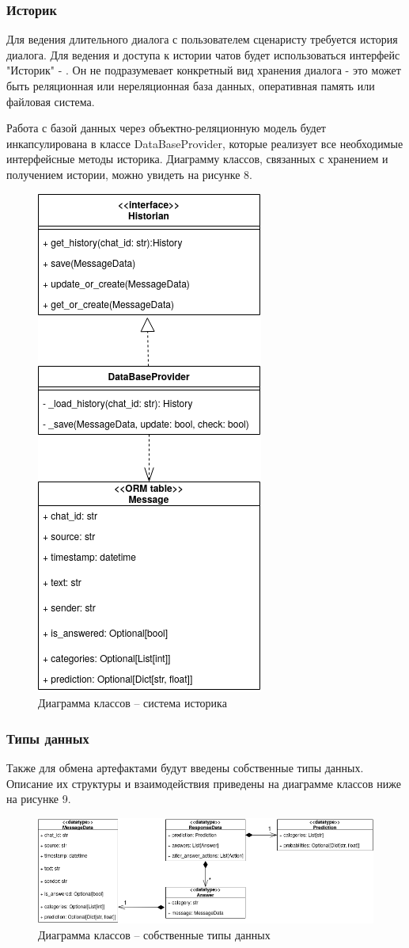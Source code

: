     \subsubsection{Историк}
    Для ведения длительного диалога с пользователем сценаристу требуется история
    диалога. Для ведения и доступа к истории чатов будет использоваться интерфейс
    "Историк" - . Он не подразумевает конкретный вид хранения
    диалога - это может быть реляционная или нереляционная база данных,
    оперативная память или файловая система.
    
    Работа с базой данных через объектно-реляционную модель будет инкапсулирована
    в классе DataBaseProvider, которые реализует все необходимые интерфейсные
    методы историка. Диаграмму классов, связанных с хранением и получением
    истории, можно увидеть на рисунке 8.
    \begin{figure}[H]
        \centering

        \includegraphics[width=0.3\linewidth]{static/ClassDiagram_dbprovider.png}
        \caption{Диаграмма классов -- система историка}
        \label{fig:class-diagram-dbprovider}
    \end{figure}

    \newpage
    \subsubsection{Типы данных}
    Также для обмена артефактами будут введены собственные типы данных.
    Описание их структуры и взаимодействия приведены на диаграмме классов ниже
    на рисунке 9.
    \begin{figure}[H]
        \centering
        \includegraphics[width=\linewidth]{static/ClassDiagram_datatypes.png}
        \caption{Диаграмма классов -- собственные типы данных}
        \label{fig:class-diagram-datatypes}
    \end{figure}

